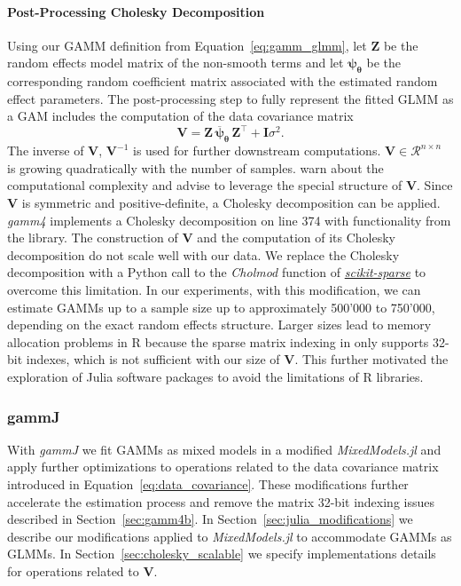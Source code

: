 \paragraph{Post-Processing Cholesky Decomposition}
Using our GAMM definition from Equation~\ref{eq:gamm_glmm}, let $\mathbf{Z}$ be the random effects model matrix of the non-smooth terms and let $\bm{\psi_\theta}$ be the corresponding random coefficient matrix associated with the estimated random effect parameters. The post-processing step to fully represent the fitted GLMM as a GAM includes the computation of the data covariance matrix  
\begin{equation}\label{eq:data_covariance}
    \mathbf{V} = \mathbf{Z} \, \bm{\overline{\psi}_\theta} \, \mathbf{Z}^{\top} + \mathbf{I}\sigma^2.
\end{equation}
The inverse of $\mathbf{V}$, $\mathbf{V}^{-1}$ is used for further downstream computations. $\mathbf{V} \in \mathcal{R}^{n \times n}$ is growing quadratically with the number of samples. \citep[page 289]{wood_generalized_2017} warn about the computational complexity and advise to leverage the special structure of $\mathbf{V}$. Since $\mathbf{V}$ is symmetric and positive-definite, a Cholesky decomposition can be applied. \textit{gamm4} implements a Cholesky decomposition on line 374 with functionality from the \cite{bates_matrix_2024} library. The construction of $\mathbf{V}$ and the computation of its Cholesky decomposition do not scale well with our data. We replace the Cholesky decomposition with a Python call \citep{reticulate} to the \textit{Cholmod} \citep{chen_algorithm_2008} function of \href{https://github.com/scikit-sparse/scikit-sparse}{\textit{scikit-sparse}} to overcome this limitation. In our experiments, with this modification, we can estimate GAMMs up to a sample size up to approximately 500'000 to 750'000, depending on the exact random effects structure. Larger sizes lead to memory allocation problems in R because the sparse matrix indexing in \cite{bates_matrix_2024} only supports 32-bit indexes, which is not sufficient with our size of $\mathbf{V}$. This further motivated the exploration of Julia software packages to avoid the limitations of R libraries.

\subsubsection{gammJ}\label{sec:gammJ}
With \textit{gammJ} we fit GAMMs as mixed models in a modified \textit{MixedModels.jl} and apply further optimizations to operations related to the data covariance matrix introduced in Equation~\ref{eq:data_covariance}. These modifications further accelerate the estimation process and remove the matrix 32-bit indexing issues described in Section~\ref{sec:gamm4b}. In Section~\ref{sec:julia_modifications} we describe our modifications applied to \textit{MixedModels.jl} to accommodate GAMMs as GLMMs. In Section~\ref{sec:cholesky_scalable} we specify implementations details for operations related to $\mathbf{V}$.


